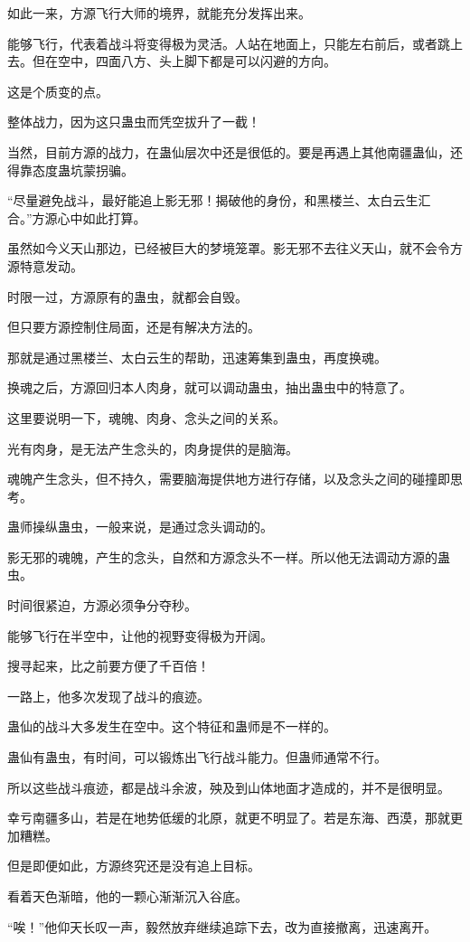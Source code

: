 \begin{this_body}
如此一来，方源飞行大师的境界，就能充分发挥出来。

能够飞行，代表着战斗将变得极为灵活。人站在地面上，只能左右前后，或者跳上去。但在空中，四面八方、头上脚下都是可以闪避的方向。

这是个质变的点。

整体战力，因为这只蛊虫而凭空拔升了一截！

当然，目前方源的战力，在蛊仙层次中还是很低的。要是再遇上其他南疆蛊仙，还得靠态度蛊坑蒙拐骗。

“尽量避免战斗，最好能追上影无邪！揭破他的身份，和黑楼兰、太白云生汇合。”方源心中如此打算。

虽然如今义天山那边，已经被巨大的梦境笼罩。影无邪不去往义天山，就不会令方源特意发动。

时限一过，方源原有的蛊虫，就都会自毁。

但只要方源控制住局面，还是有解决方法的。

那就是通过黑楼兰、太白云生的帮助，迅速筹集到蛊虫，再度换魂。

换魂之后，方源回归本人肉身，就可以调动蛊虫，抽出蛊虫中的特意了。

这里要说明一下，魂魄、肉身、念头之间的关系。

光有肉身，是无法产生念头的，肉身提供的是脑海。

魂魄产生念头，但不持久，需要脑海提供地方进行存储，以及念头之间的碰撞即思考。

蛊师操纵蛊虫，一般来说，是通过念头调动的。

影无邪的魂魄，产生的念头，自然和方源念头不一样。所以他无法调动方源的蛊虫。

时间很紧迫，方源必须争分夺秒。

能够飞行在半空中，让他的视野变得极为开阔。

搜寻起来，比之前要方便了千百倍！

一路上，他多次发现了战斗的痕迹。

蛊仙的战斗大多发生在空中。这个特征和蛊师是不一样的。

蛊仙有蛊虫，有时间，可以锻炼出飞行战斗能力。但蛊师通常不行。

所以这些战斗痕迹，都是战斗余波，殃及到山体地面才造成的，并不是很明显。

幸亏南疆多山，若是在地势低缓的北原，就更不明显了。若是东海、西漠，那就更加糟糕。

但是即便如此，方源终究还是没有追上目标。

看着天色渐暗，他的一颗心渐渐沉入谷底。

“唉！”他仰天长叹一声，毅然放弃继续追踪下去，改为直接撤离，迅速离开。


\end{this_body}
